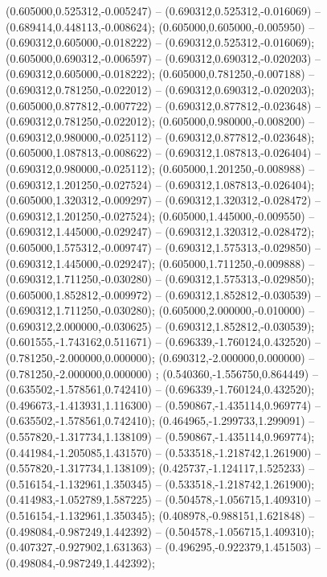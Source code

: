  (0.605000,0.525312,-0.005247) -- (0.690312,0.525312,-0.016069) -- (0.689414,0.448113,-0.008624);
 (0.605000,0.605000,-0.005950) -- (0.690312,0.605000,-0.018222) -- (0.690312,0.525312,-0.016069);
 (0.605000,0.690312,-0.006597) -- (0.690312,0.690312,-0.020203) -- (0.690312,0.605000,-0.018222);
 (0.605000,0.781250,-0.007188) -- (0.690312,0.781250,-0.022012) -- (0.690312,0.690312,-0.020203);
 (0.605000,0.877812,-0.007722) -- (0.690312,0.877812,-0.023648) -- (0.690312,0.781250,-0.022012);
 (0.605000,0.980000,-0.008200) -- (0.690312,0.980000,-0.025112) -- (0.690312,0.877812,-0.023648);
 (0.605000,1.087813,-0.008622) -- (0.690312,1.087813,-0.026404) -- (0.690312,0.980000,-0.025112);
 (0.605000,1.201250,-0.008988) -- (0.690312,1.201250,-0.027524) -- (0.690312,1.087813,-0.026404);
 (0.605000,1.320312,-0.009297) -- (0.690312,1.320312,-0.028472) -- (0.690312,1.201250,-0.027524);
 (0.605000,1.445000,-0.009550) -- (0.690312,1.445000,-0.029247) -- (0.690312,1.320312,-0.028472);
 (0.605000,1.575312,-0.009747) -- (0.690312,1.575313,-0.029850) -- (0.690312,1.445000,-0.029247);
 (0.605000,1.711250,-0.009888) -- (0.690312,1.711250,-0.030280) -- (0.690312,1.575313,-0.029850);
 (0.605000,1.852812,-0.009972) -- (0.690312,1.852812,-0.030539) -- (0.690312,1.711250,-0.030280);
 (0.605000,2.000000,-0.010000) -- (0.690312,2.000000,-0.030625) -- (0.690312,1.852812,-0.030539);
 (0.601555,-1.743162,0.511671) -- (0.696339,-1.760124,0.432520) -- (0.781250,-2.000000,0.000000);
 (0.690312,-2.000000,0.000000) -- (0.781250,-2.000000,0.000000) ;
 (0.540360,-1.556750,0.864449) -- (0.635502,-1.578561,0.742410) -- (0.696339,-1.760124,0.432520);
 (0.496673,-1.413931,1.116300) -- (0.590867,-1.435114,0.969774) -- (0.635502,-1.578561,0.742410);
 (0.464965,-1.299733,1.299091) -- (0.557820,-1.317734,1.138109) -- (0.590867,-1.435114,0.969774);
 (0.441984,-1.205085,1.431570) -- (0.533518,-1.218742,1.261900) -- (0.557820,-1.317734,1.138109);
 (0.425737,-1.124117,1.525233) -- (0.516154,-1.132961,1.350345) -- (0.533518,-1.218742,1.261900);
 (0.414983,-1.052789,1.587225) -- (0.504578,-1.056715,1.409310) -- (0.516154,-1.132961,1.350345);
 (0.408978,-0.988151,1.621848) -- (0.498084,-0.987249,1.442392) -- (0.504578,-1.056715,1.409310);
 (0.407327,-0.927902,1.631363) -- (0.496295,-0.922379,1.451503) -- (0.498084,-0.987249,1.442392);
